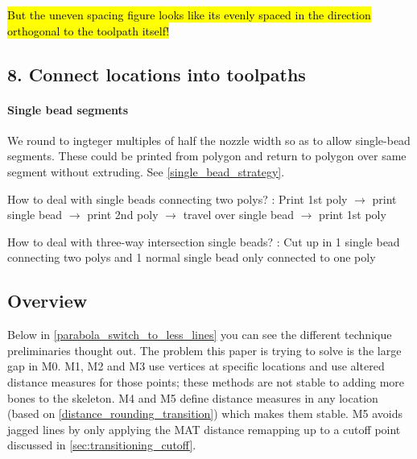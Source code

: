 \hl{But the uneven spacing figure looks like its evenly spaced in the direction orthogonal to the toolpath itself!}






\subsection{8. Connect locations into toolpaths}
\paragraph{Single bead segments}
We round to ingteger multiples of half the nozzle width so as to allow single-bead segments.
These could be printed from polygon and return to polygon over same segment without extruding.
See \cref{single_bead_strategy}.

How to deal with single beads connecting two polys?
: Print 1st poly $\to$ print single bead $\to$ print 2nd poly $\to$ travel over single bead $\to$ print 1st poly

How to deal with three-way intersection single beads?
: Cut up in 1 single bead connecting two polys and 1 normal single bead only connected to one poly






\subsection{Overview}
Below in \cref{parabola_switch_to_less_lines} you can see the different technique preliminaries thought out.
The problem this paper is trying to solve is the large gap in M0.
M1, M2 and M3 use vertices at specific locations and use altered distance measures for those points; these methods are not stable to adding more bones to the skeleton.
M4 and M5 define distance measures in any location (based on \cref{distance_rounding_transition}) which makes them stable.
M5 avoids jagged lines by only applying the MAT distance remapping up to a cutoff point discussed in \cref{sec:transitioning_cutoff}.



